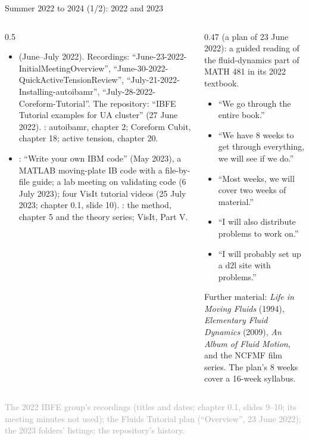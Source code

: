\documentclass[aspectratio=169,11pt]{beamer}
\newcommand{\sourcecredit}[1]{\vfill\begin{flushright}\tiny\textcolor{DarkGray}{#1}\end{flushright}}
\begin{document}
\begin{frame}{Summer 2022 to 2024 (1/2): 2022 and 2023}
\label{fr:summers1}
\begin{columns}[T,onlytextwidth]
\begin{column}{0.5\textwidth}
\footnotesize
\begin{itemize}\setlength{\itemsep}{3pt}
  \item {} (June--July 2022). Recordings: ``June-23-2022-InitialMeetingOverview'', ``June-30-2022-QuickActiveTensionReview'', ``July-21-2022-Installing-autoibamr'', ``July-28-2022-Coreform-Tutorial''. The repository: ``IBFE Tutorial examples for UA cluster'' (27 June 2022). : autoibamr, chapter 2; Coreform Cubit, chapter 18; active tension, chapter 20.
  \item {}: ``Write your own IBM code'' (May 2023), a MATLAB moving-plate IB code with a file-by-file guide; a lab meeting on validating code (6 July 2023); four VisIt tutorial videos (25 July 2023; chapter 0.1, slide 10). : the method, chapter 5 and the theory series; VisIt, Part V.
\end{itemize}
\end{column}
\begin{column}{0.47\textwidth}
\scriptsize
{} (a plan of 23 June 2022): a guided reading of the fluid-dynamics part of MATH 481 in its 2022 textbook.
\begin{itemize}\setlength{\itemsep}{2pt}
  \item ``We go through the entire book.''
  \item ``We have 8 weeks to get through everything, we will see if we do.''
  \item ``Most weeks, we will cover two weeks of material.''
  \item ``I will also distribute problems to work on.''
  \item ``I will probably set up a d2l site with problems.''
\end{itemize}
Further material: \emph{Life in Moving Fluids} (1994), \emph{Elementary Fluid Dynamics} (2009), \emph{An Album of Fluid Motion}, and the NCFMF film series. The plan's 8 weeks cover a 16-week syllabus.
\end{column}
\end{columns}
\sourcecredit{The 2022 IBFE group's recordings (titles and dates; chapter 0.1, slides 9--10; its meeting minutes not used); the Fluids Tutorial plan (``Overview'', 23 June 2022); the 2023 folders' listings; the repository's history.}
\end{frame}
\end{document}
